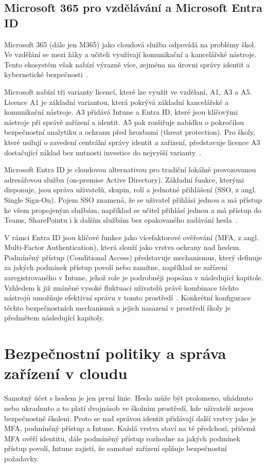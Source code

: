 \documentclass[male,czech,api_bc]{kitheses}
\begin{document}
\section{Microsoft 365 pro vzdělávání a Microsoft Entra ID}
Microsoft 365 (dále jen M365) jako cloudová služba odpovídá na problémy škol. Ve vzdělání se mezi žáky a učiteli využívají komunikační a kancelářské nástroje. Tento ekosystém však nabízí výrazně více, zejména na úrovni správy identit a kybernetické bezpečnosti~\cite{Office365_article}.

Microsoft nabízí tři varianty licencí, které lze využít ve vzdělaní, A1, A3 a A5. Licence A1 je základní variantou, která pokrývá základní kancelářské a komunikační nástroje. A3 přidává Intune a Entra ID, které jsou klíčovými nástroje při správě zařízení a identit. A5 pak rozšiřuje nabídku o pokročilou bezpečnostní analytiku a ochranu před hrozbami (threat protection). Pro školy, které usilují o zavedení centrální správy identit a zařízení, představuje licence A3 dostačující základ bez nutnosti investice do nejvyšší varianty~\cite{MicrosoftM365Edu2025}.

Microsoft Entra ID je cloudovou alternativou pro tradiční lokálně provozovanou adresářovou službu (on-premise Active Directory). Základní funkce, kterými disponuje, jsou správa uživatelů, skupin, rolí a jednotné přihlášení (SSO, z angl. Single Sign-On). Pojem SSO znamená, že se uživatel přihlásí jednou a má přístup ke všem propojeným službám, například se učitel přihlásí jednou a má přístup do Teams, SharePointu i k dalším službám bez opakovaného zadávání hesla~\cite{MicrosoftEntra2025}.

V rámci Entra ID jsou klíčové funkce jako vícefaktorové ověřování (MFA, z angl. Multi-Factor Authentication), která slouží jako vrstva ochrany nad heslem. Podmíněný přístup (Conditional Access) představuje mechanismus, který definuje za jakých podmínek přístup povolí nebo zamítne, například ze zařízení zaregistrovaného v Intune, jehož role je podrobněji popsána v následující kapitole. Vzhledem k již zmíněné vysoké fluktuaci uživatelů právě kombinace těchto nástrojů umožňuje efektivní správu v tomto prostředí~\cite{EntraID_article}. Konkrétní konfigurace těchto bezpečnostních mechanismů a jejich nasazení v prostředí školy je předmětem následující kapitoly.

\chapter{Bezpečnostní politiky a správa zařízení v cloudu}
Samotný účet s heslem je jen první linie. Heslo může být prolomeno, uhádnuto nebo ukradnuto a to platí dvojnásob ve školním prostředí, kde uživatelé nejsou bezpečnostně školeni. Proto se nad správou identit přidávají další vrstvy jako je MFA, podmíněný přístup a Intune. Každá vrstva staví na té předchozí, přičemž MFA ověří identitu, dále podmíněný přístup rozhodne za jakých podmínek přístup povolí, Intune zajistí, že samotné zařízení splňuje bezpečnostní požadavky.
\end{document}
